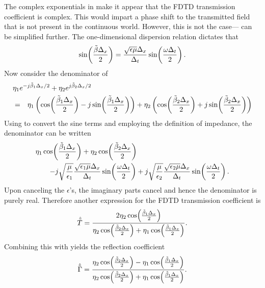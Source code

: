 The complex exponentials in  make it
appear that the FDTD transmission coefficient is complex.  This would
impart a phase shift to the transmitted field that is not present in
the continuous world.  However, this is not the
case--- can be simplified further.  The
one-dimensional dispersion relation  dictates that
\begin{equation}
  \sin\!\left(\frac{\tilde{\beta}\Delta_x}{2}\right) = 
  \frac{\sqrt{\epsilon\mu}\Delta_x}{\Delta_t}
  \sin\!\left(\frac{\omega\Delta_t}{2}\right).
  \label{eq:dispersionConversion}
\end{equation}
Now consider the denominator of 
\begin{eqnarray}
  \lefteqn{\eta_1 e^{-j\tbeta_1\Delx/2} + \eta_2 e^{j\tbeta_2\Delx/2}} &&
  \nonumber
 \\
  &=&
    \eta_1\left(\cos\!\left(\frac{\tbeta_1\Delx}{2}\right)
               -j\sin\!\left(\frac{\tbeta_1\Delx}{2}\right)\right) + 
    \eta_2\left(\cos\!\left(\frac{\tbeta_2\Delx}{2}\right)
               +j\sin\!\left(\frac{\tbeta_2\Delx}{2}\right)\right)
\end{eqnarray}
Using  to convert the sine terms and
employing the definition of impedance, the denominator can be written
\begin{eqnarray}
   \lefteqn{
    \eta_1\cos\!\left(\frac{\tbeta_1\Delx}{2}\right) + 
    \eta_2\cos\!\left(\frac{\tbeta_2\Delx}{2}\right)} &&
 \nonumber \\
  && \quad - j\sqrt{\frac{\mu}{\epsilon_1}}
              \frac{\sqrt{\epsilon_1\mu}\Delx}{\Delt}
                    \sin\!\left(\frac{\omega\Delt}{2}\right)
           + j\sqrt{\frac{\mu}{\epsilon_2}}
              \frac{\sqrt{\epsilon_2\mu}\Delx}{\Delt}
                    \sin\!\left(\frac{\omega\Delt}{2}\right).
\end{eqnarray}
Upon canceling the $\epsilon$'s, the imaginary parts cancel and hence
the denominator is purely real.  Therefore another expression for
the FDTD transmission coefficient is
\begin{equation}
  \hat{\tilde{T}} = \frac{2 \eta_2 \cos\!\left(\frac{\tilde{\beta}_1\Delta_x}{2}\right)}
             {\eta_2 \cos\!\left(\frac{\tilde{\beta}_2\Delta_x}{2}\right)
            + \eta_1 \cos\!\left(\frac{\tilde{\beta}_1\Delta_x}{2}\right)}.
  \label{eq:fdtdTransCoef}
\end{equation}
Combining this with  yields the reflection
coefficient
\begin{equation}
  \hat{\tilde{\Gamma}} = \frac{\eta_2 \cos\!\left(\frac{\tilde{\beta}_2\Delta_x}{2}\right)
            - \eta_1 \cos\!\left(\frac{\tilde{\beta}_1\Delta_x}{2}\right)}
             {\eta_2 \cos\!\left(\frac{\tilde{\beta}_2\Delta_x}{2}\right)
            + \eta_1 \cos\!\left(\frac{\tilde{\beta}_1\Delta_x}{2}\right)}.
  \label{eq:fdtdRefCoef}
\end{equation}
